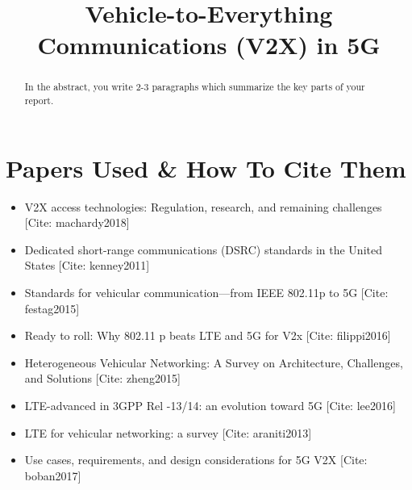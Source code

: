 \documentclass[conference,12pt,onecolumn]{IEEEtran}
\begin{document}
%
\title{Vehicle-to-Everything Communications (V2X) in 5G}


\author{
}


\maketitle

\begin{abstract}
In the abstract, you write 2-3 paragraphs which summarize the key parts of your report.
\end{abstract}


\IEEEpeerreviewmaketitle

\section{Papers Used \& How To Cite Them}
\begin{itemize}
\item V2X access technologies: Regulation, research, and remaining challenges [Cite: machardy2018] \cite{machardy2018}
\item Dedicated short-range communications (DSRC) standards in the United States [Cite: kenney2011] \cite{kenney2011}
\item Standards for vehicular communication---from IEEE 802.11p to 5G [Cite: festag2015]\cite{festag2015}
\item Ready to roll: Why 802.11 p beats LTE and 5G for V2x [Cite: filippi2016] \cite{filippi2016}
\item Heterogeneous Vehicular Networking: A Survey on Architecture, Challenges, and Solutions [Cite: zheng2015] \cite{zheng2015}
\item LTE-advanced in 3GPP Rel -13/14: an evolution toward 5G [Cite: lee2016] \cite{lee2016}
\item LTE for vehicular networking: a survey [Cite: araniti2013] \cite{araniti2013}
  \item Use cases, requirements, and design considerations for 5G V2X [Cite: boban2017] \cite{boban2017}
  \end{itemize}
\end{document}
